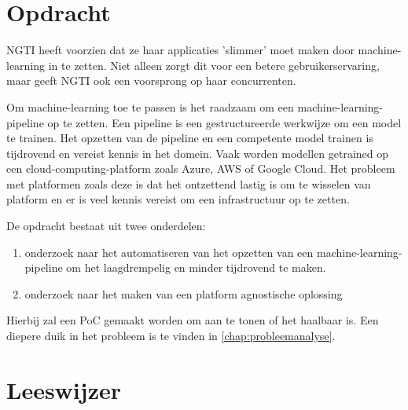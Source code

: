 \section{Opdracht}\label{sec:opdracht}
NGTI heeft voorzien dat ze haar applicaties 'slimmer' moet maken door \gls{machine-learning} in te zetten. Niet alleen zorgt dit voor een betere gebruikerservaring, maar geeft NGTI ook een voorsprong op haar concurrenten.

Om \gls{machine-learning} toe te passen is het raadzaam om een \gls{machine-learning-pipeline} op te zetten. Een pipeline is een gestructureerde werkwijze om een model te trainen. Het opzetten van de pipeline en een competente model trainen is tijdrovend en vereist kennis in het domein. Vaak worden modellen getrained op een \gls{cloud-computing-platform} zoals Azure, AWS of Google Cloud. Het probleem met platformen zoals deze is dat het ontzettend lastig is om te wisselen van platform en er is veel kennis vereist om een infrastructuur op te zetten.\bigskip\bigskip\bigskip

De opdracht bestaat uit twee onderdelen:
\begin{enumerate}
  \item onderzoek naar het automatiseren van het opzetten van een \gls{machine-learning-pipeline} om het laagdrempelig en minder tijdrovend te maken.
  \item onderzoek naar het maken van een platform agnostische oplossing
\end{enumerate}

Hierbij zal een PoC gemaakt worden om aan te tonen of het haalbaar is. Een diepere duik in het probleem is te vinden in \autoref{chap:probleemanalyse}.

\section{Leeswijzer}\label{sec:leeswijzer}
